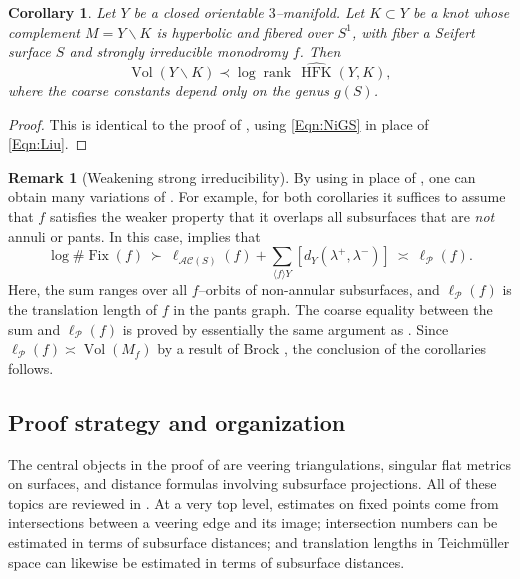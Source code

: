 \documentclass[11pt,letterpaper]{amsart}
\newcommand{\mc}{\mathcal}
\newcommand{\HFK}{\operatorname{HFK}}
\newcommand{\Fix}{\operatorname{Fix}}
\numberwithin{equation}{section}
\newtheorem{corollary}[theorem]{Corollary}
\theoremstyle{definition}
\newtheorem{remark}[theorem]{Remark}
\renewcommand{\setminus}{\smallsetminus}
\newcommand{\AC}{\mathcal{AC}}
\DeclareMathOperator{\vol}{Vol}
\begin{document}
\begin{corollary}\label{Cor:KnotHFK}
Let $Y$ be a closed orientable $3$--manifold. Let $K \subset Y$ be a knot whose complement $M = Y \setminus K$ is hyperbolic and fibered over $S^1$, with fiber a Seifert surface $S$ and strongly irreducible monodromy $f$. Then
\[
\vol(Y \setminus K) \prec \log \operatorname{rank} \, \widehat{\HFK}(Y, K),
\]
where the coarse constants depend only on the genus $g(S)$.
\end{corollary}

\begin{proof}
This is identical to the proof of , using \eqref{Eqn:NiGS} in place of \eqref{Eqn:Liu}.
\end{proof}

\begin{remark}[Weakening strong irreducibility]
By using  in place of , one can obtain many variations of . For example, for both corollaries it suffices to assume that $f$ satisfies the weaker property that it overlaps all subsurfaces that are \emph{not} annuli or pants. In this case,  implies that 
\[
\log \# \Fix(f) \: \succ \:  \ell_{\AC(S)}(f) +  \sum_{\langle f \rangle Y} [d_Y(\lambda^+,\lambda^-) ]
\: \asymp \: \ell_{\mc P}(f).
\]
Here, the sum ranges over all $f$--orbits of non-annular subsurfaces, and $\ell_{\mc P}(f)$ is the translation length of $f$ in the pants graph. The coarse equality between the sum and $\ell_{\mc P}(f)$ is proved by 
essentially the same argument as .
Since $\ell_{\mc P}(f) \asymp \vol(M_f)$ by a result of Brock \cite{Brock:fibered}, the conclusion of the corollaries follows.
\end{remark}


\subsection*{Proof strategy and organization}
The central objects in the proof of  are veering triangulations, singular flat metrics on surfaces, and distance formulas involving subsurface projections. All of these topics are reviewed in . At a very top level, estimates on fixed points come from intersections between a veering edge and its image; intersection numbers can be estimated in terms of subsurface distances; and translation lengths in Teichm\"uller space can likewise be estimated in terms of subsurface distances.
\end{document}
